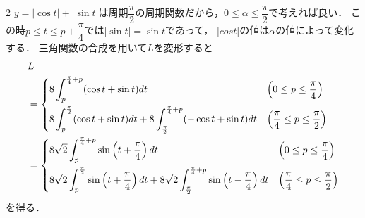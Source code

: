 \documentclass[../../main.tex]{subfiles}
\begin{document}
\begin{multicols}{2}
  $y=|\cos t| + |\sin t|$は周期$\dfrac{\pi}{2}$の周期関数だから，$0 \le \alpha \le \dfrac{\pi}{2}$で考えれば良い．
  この時$p \le t \le p + \dfrac{\pi}{4}$では$|\sin t| = \sin t$であって，
  $|cos t|$の値は$\alpha$の値によって変化する．
  三角関数の合成を用いて$L$を変形すると
  \begin{align}
    & L                                                                                                                                                                                                                                         \\
    & =
    \begin{dcases}
      8\int_{p}^{\frac{\pi}{4}+p} (\cos t + \sin t) dt                                                               & \left(0 \le p \le \dfrac{\pi}{4}\right)             \\
      8\int_{p}^{\frac{\pi}{2}} (\cos t + \sin t) dt + 8\int_{\frac{\pi}{2}}^{\frac{\pi}{4}+p} (-\cos t + \sin t) dt & \left(\dfrac{\pi}{4} \le p \le \dfrac{\pi}{2}\right)
    \end{dcases}                                                 \\
    & =
    \begin{dcases}
      8\sqrt{2}\int_{p}^{\frac{\pi}{4}+p} \sin\left(t + \dfrac{\pi}{4}\right) dt                                                                                      & \left(0 \le p \le \dfrac{\pi}{4}\right)             \\
      8\sqrt{2}\int_{p}^{\frac{\pi}{2}}\sin\left(t + \dfrac{\pi}{4}\right) dt + 8\sqrt{2}\int_{\frac{\pi}{2}}^{\frac{\pi}{4}+p} \sin\left(t - \dfrac{\pi}{4}\right) dt & \left(\dfrac{\pi}{4} \le p \le \dfrac{\pi}{2}\right)
    \end{dcases}
  \end{align}
  を得る．


\end{multicols}
\end{document}
